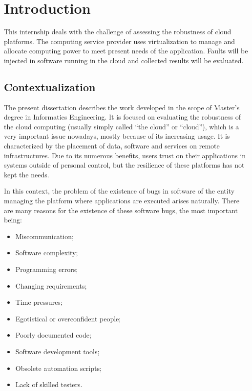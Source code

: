 \clearpage
\section{Introduction}

This internship deals with the challenge of assessing the robustness of cloud platforms. The computing service provider uses virtualization to manage and allocate computing power to meet present needs of the application.
Faults will be injected in software running in the cloud and collected results will be evaluated.

\subsection{Contextualization}


The present dissertation describes the work developed in the scope of Master's degree in Informatics Engineering. It is focused on evaluating the robustness of the cloud computing (usually simply called ``the cloud'' or ``cloud''), which is a very important issue nowadays, mostly because of its increasing usage.
It is characterized by the placement of data, software and services on remote infrastructures.
Due to its numerous benefits, users trust on their applications in systems outside of personal control, but the resilience of these platforms has not kept the needs.

In this context, the problem of the existence of bugs in software of the entity managing the platform where applications are executed arises naturally. There are many reasons for the existence of these software bugs, the most important being:

\begin{itemize}
	\item Miscommunication;
	\item Software complexity;
	\item Programming errors;
	\item Changing requirements;
	\item Time pressures;
	\item Egotistical or overconfident people;
	\item Poorly documented code;
	\item Software development tools;
	\item Obsolete automation scripts;
	\item Lack of skilled testers.
\end{itemize}

